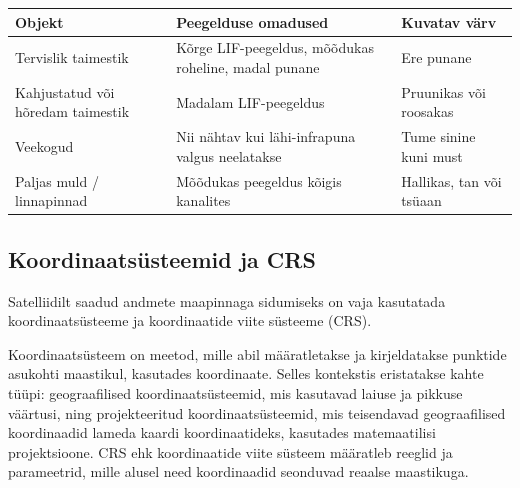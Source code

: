 \begin{table}
\caption{NGR indeksi värvi kasutusjuhend}
\label{tab:NGR_kasutus}
\begin{longtable}{lp{5cm}l}
    \hline
    Objekt & Peegelduse omadused & Kuvatav värv                          \\ 
    \hline
    Tervislik taimestik & Kõrge LIF-peegeldus, mõõdukas roheline, madal punane & Ere punane \\
    Kahjustatud või hõredam taimestik & Madalam LIF-peegeldus & Pruunikas või roosakas \\
    Veekogud & 	Nii nähtav kui lähi-infrapuna valgus neelatakse & Tume sinine kuni must \\
    Paljas muld / linnapinnad & Mõõdukas peegeldus kõigis kanalites & Hallikas, tan või tsüaan\\
    \hline
\end{longtable}
\end{table}

\subsection{Koordinaatsüsteemid ja CRS}
Satelliidilt saadud andmete maapinnaga sidumiseks on vaja kasutatada koordinaatsüsteeme ja
koordinaatide viite süsteeme (CRS).

Koordinaatsüsteem on meetod, mille abil määratletakse ja kirjeldatakse punktide
asukohti maastikul, kasutades koordinaate. Selles kontekstis eristatakse kahte
tüüpi: geograafilised koordinaatsüsteemid, mis kasutavad laiuse ja pikkuse
väärtusi, ning projekteeritud koordinaatsüsteemid, mis teisendavad
geograafilised koordinaadid lameda kaardi koordinaatideks, kasutades
matemaatilisi projektsioone. CRS ehk koordinaatide viite süsteem määratleb
reeglid ja parameetrid, mille alusel need koordinaadid seonduvad reaalse
maastikuga. \cite{8CoordinateReference}

